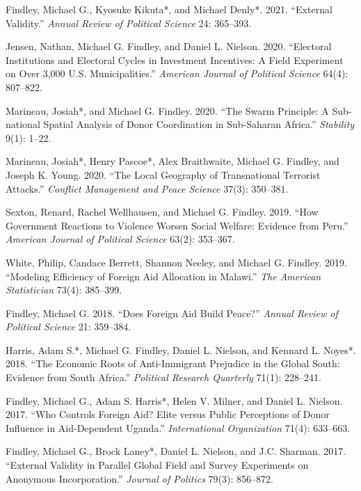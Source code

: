 \documentclass[10pt]{article}
\begin{document}
\begin{etaremune}
\item Findley, Michael G., Kyosuke Kikuta*, and Michael Denly*. 2021. ``External Validity.'' \textit{Annual Review of Political Science} 24: 365--393. 

\item Jensen, Nathan, Michael G. Findley, and Daniel L. Nielson. 2020. ``Electoral Institutions and Electoral Cycles in Investment Incentives: A Field Experiment on Over 3,000 U.S. Municipalities.'' \textit{American Journal of Political Science} 64(4): 807--822.

\item Marineau, Josiah*, and Michael G. Findley. 2020. ``The Swarm Principle: A Sub-national Spatial Analysis of Donor Coordination in Sub-Saharan Africa.'' \textit{Stability} 9(1): 1--22.

\item Marineau, Josiah*, Henry Pascoe*, Alex Braithwaite, Michael G. Findley, and Joseph K. Young. 2020. ``The Local Geography of Transnational Terrorist Attacks.'' \textit{Conflict Management and Peace Science} 37(3): 350--381.

\item Sexton, Renard, Rachel Wellhausen, and Michael G. Findley. 2019. ``How Government Reactions to Violence Worsen Social Welfare: Evidence from Peru.'' \textit{American Journal of Political Science} 63(2): 353--367.

\item White, Philip, Candace Berrett, Shannon Neeley, and Michael G. Findley. 2019. ``Modeling Efficiency of Foreign Aid Allocation in Malawi.'' \textit{The American Statistician} 73(4): 385--399.

\item Findley, Michael G. 2018. ``Does Foreign Aid Build Peace?'' \textit{Annual Review of Political Science} 21: 359--384.

\item Harris, Adam S.*, Michael G. Findley, Daniel L. Nielson, and Kennard L. Noyes*. 2018. ``The Economic Roots of Anti-Immigrant Prejudice in the Global South: Evidence from South Africa.'' \textit{Political Research Quarterly} 71(1): 228--241.

\item Findley, Michael G., Adam S. Harris*, Helen V. Milner, and Daniel L. Nielson. 2017. ``Who Controls Foreign Aid? Elite versus Public Perceptions of Donor Influence in Aid-Dependent Uganda.'' \textit{International Organization} 71(4): 633--663.

\item Findley, Michael G., Brock Laney*, Daniel L. Nielson, and J.C. Sharman. 2017. ``External Validity in Parallel Global Field and Survey Experiments on Anonymous Incorporation.'' \textit{Journal of Politics} 79(3): 856--872.


\end{etaremune}
\end{document}
